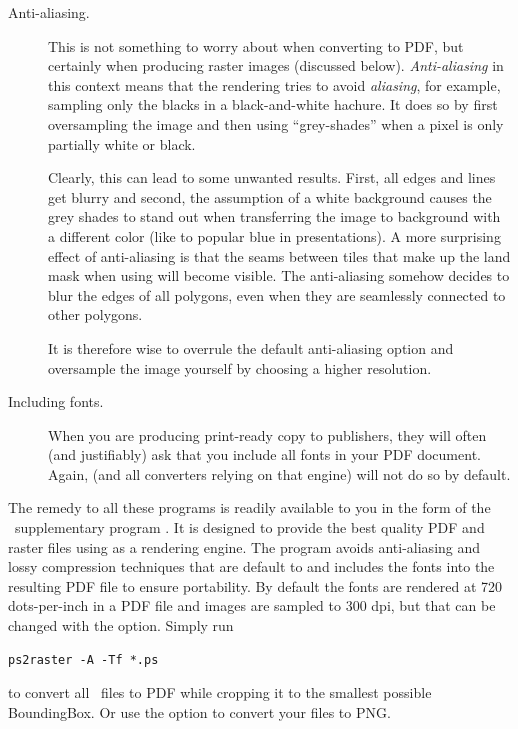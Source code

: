 \begin{description}
\item[Anti-aliasing.] This is not something to worry about when converting to PDF, but certainly when producing raster images (discussed below). \emph{Anti-aliasing} in this context means that the rendering tries to avoid \emph{aliasing}, for example, sampling only the blacks in a black-and-white hachure. It does so by first oversampling the image and then using ``grey-shades'' when a pixel is only partially white or black.

Clearly, this can lead to some unwanted results. First, all edges and lines get blurry and second, the assumption of a white background causes the grey shades to stand out when transferring the image to background with a different color (like to popular blue in  presentations). A more surprising effect of anti-aliasing is that the seams between tiles that make up the land mask when using  will become visible. The anti-aliasing somehow decides to blur the edges of all polygons, even when they are seamlessly connected to other polygons.

It is therefore wise to overrule the default anti-aliasing option and oversample the image yourself by choosing a higher resolution.

\item[Including fonts.] When you are producing print-ready copy to publishers, they will often (and justifiably) ask that you include all fonts in your PDF document. Again,  (and all converters relying on that engine) will not do so by default.
\end{description}

The remedy to all these programs is readily available to you in the form of the \GMT\ supplementary program . It is designed to provide the best quality PDF and raster files using  as a rendering engine. The program  avoids anti-aliasing and lossy compression techniques that are default to  and includes the fonts into the resulting PDF file to ensure portability. By default the fonts are rendered at 720 dots-per-inch in a PDF file and images are sampled to 300 dpi, but that can be changed with the  option. Simply run
\small
\begin{verbatim}
ps2raster -A -Tf *.ps
\end{verbatim}
\normalsize
to convert all \PS\ files to PDF while cropping it to the smallest possible BoundingBox. Or use the  option to convert your files to PNG.

